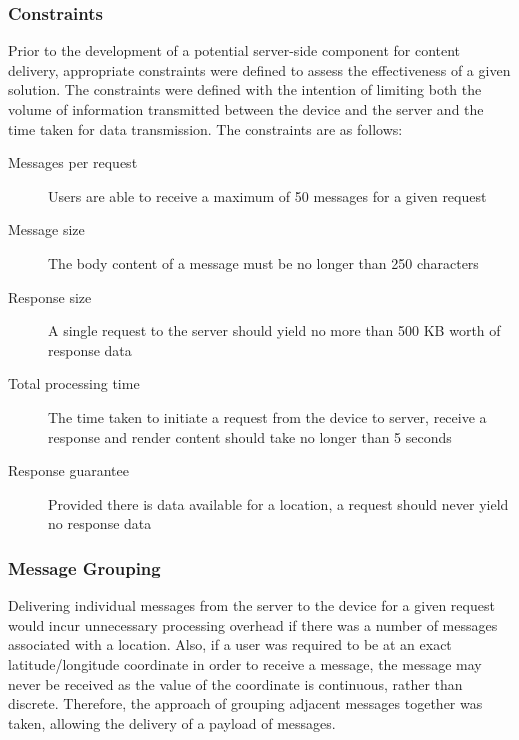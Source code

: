 \documentclass{article}
\begin{document}
\subsubsection{Constraints} %
\label{ssub:constraints}

Prior to the development of a potential server-side component for content delivery, appropriate constraints were defined to assess the effectiveness of a given solution. The constraints were defined with the intention of limiting both the volume of information transmitted between the device and the server and the time taken for data transmission. The constraints are as follows:

\begin{description}
	\item[Messages per request] Users are able to receive a maximum of 50 messages for a given request
	\item[Message size] The body content of a message must be no longer than 250 characters
	\item[Response size] A single request to the server should yield no more than 500 KB worth of response data
	\item[Total processing time] The time taken to initiate a request from the device to server, receive a response and render content should take no longer than 5 seconds
	\item[Response guarantee] Provided there is data available for a location, a request should never yield no response data
\end{description}



\subsubsection{Message Grouping} %
\label{ssub:message_grouping}

Delivering individual messages from the server to the device for a given request would incur unnecessary processing overhead if there was a number of messages associated with a location. Also, if a user was required to be at an exact latitude/longitude coordinate in order to receive a message, the message may never be received as the value of the coordinate is continuous, rather than discrete. Therefore, the approach of grouping adjacent messages together was taken, allowing the delivery of a payload of messages.
\end{document}
